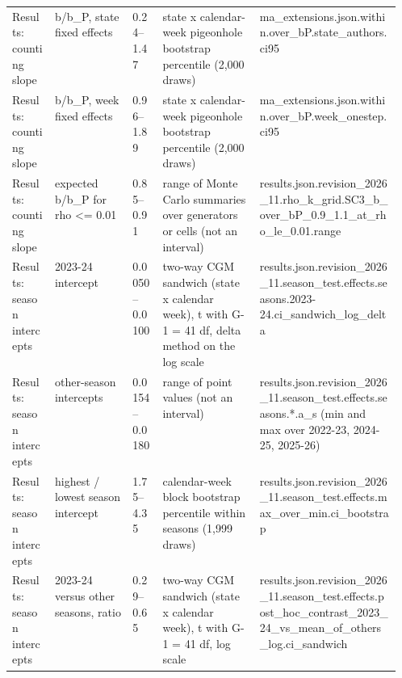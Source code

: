 \begin{table}[!tbp]
\begin{tabularx}{\linewidth}{@{}p{0.11\linewidth}p{0.2\linewidth}lp{0.25\linewidth}X@{}}
Results: counting slope & b/b\_P, state fixed effects & 0.24--1.47 & state x calendar-week pigeonhole bootstrap percentile (2,000 draws) & {\ttfamily\tiny ma\_extensions.\allowbreak{}json.\allowbreak{}within.\allowbreak{}over\_bP.\allowbreak{}state\_authors.\allowbreak{}ci95} \\
Results: counting slope & b/b\_P, week fixed effects & 0.96--1.89 & state x calendar-week pigeonhole bootstrap percentile (2,000 draws) & {\ttfamily\tiny ma\_extensions.\allowbreak{}json.\allowbreak{}within.\allowbreak{}over\_bP.\allowbreak{}week\_onestep.\allowbreak{}ci95} \\
Results: counting slope & expected b/b\_P for rho <= 0.01 & 0.85--0.91 & range of Monte Carlo summaries over generators or cells (not an interval) & {\ttfamily\tiny results.\allowbreak{}json.\allowbreak{}revision\_2026\_11.\allowbreak{}rho\_k\_grid.\allowbreak{}SC3\_b\_over\_bP\_0.\allowbreak{}9\_1.\allowbreak{}1\_at\_rho\_le\_0.\allowbreak{}01.\allowbreak{}range} \\
Results: season intercepts & 2023-24 intercept & 0.0050--0.0100 & two-way CGM sandwich (state x calendar week), t with G-1 = 41 df, delta method on the log scale & {\ttfamily\tiny results.\allowbreak{}json.\allowbreak{}revision\_2026\_11.\allowbreak{}season\_test.\allowbreak{}effects.\allowbreak{}seasons.\allowbreak{}2023-24.\allowbreak{}ci\_sandwich\_log\_delta} \\
Results: season intercepts & other-season intercepts & 0.0154--0.0180 & range of point values (not an interval) & {\ttfamily\tiny results.\allowbreak{}json.\allowbreak{}revision\_2026\_11.\allowbreak{}season\_test.\allowbreak{}effects.\allowbreak{}seasons.\allowbreak{}*.\allowbreak{}a\_s (min and max over 2022-23, 2024-25, 2025-26)} \\
Results: season intercepts & highest / lowest season intercept & 1.75--4.35 & calendar-week block bootstrap percentile within seasons (1,999 draws) & {\ttfamily\tiny results.\allowbreak{}json.\allowbreak{}revision\_2026\_11.\allowbreak{}season\_test.\allowbreak{}effects.\allowbreak{}max\_over\_min.\allowbreak{}ci\_bootstrap} \\
Results: season intercepts & 2023-24 versus other seasons, ratio & 0.29--0.65 & two-way CGM sandwich (state x calendar week), t with G-1 = 41 df, log scale & {\ttfamily\tiny results.\allowbreak{}json.\allowbreak{}revision\_2026\_11.\allowbreak{}season\_test.\allowbreak{}effects.\allowbreak{}post\_hoc\_contrast\_2023\_24\_vs\_mean\_of\_others\_log.\allowbreak{}ci\_sandwich} \\

\end{tabularx}
\end{table}
